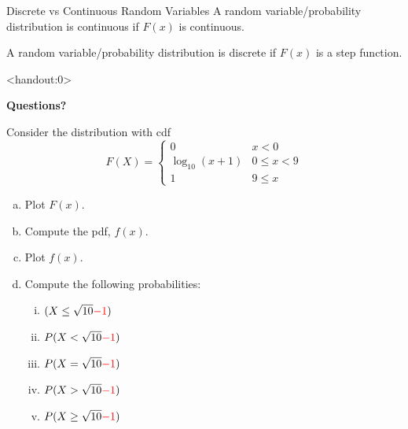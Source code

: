 \begin{frame}
  \begin{block}{Discrete vs Continuous Random Variables}
    A random variable/probability distribution is continuous if $F(x)$ is continuous.

    \bigskip

    A random variable/probability distribution is discrete if $F(x)$ is a step function.

  \end{block}

\end{frame}

\begin{frame}<handout:0>
  \begin{center}
    \Huge{\textbf{Questions?}}
  \end{center}
\end{frame}

\begin{frame}

  \begin{block}{\exercise}
  
  Consider the distribution with cdf
  $$
  F(X)=
  \left\{
  \begin{array}{ll}
  0 & x < 0\\
  \log_{10}(x + 1) & 0 \leq x < 9\\
  1 & 9 \leq x
  \end{array}
  \right.
  $$
  
  \begin{enumerate}[a)]
  \item Plot $F(x)$.
  \item Compute the pdf, $f(x)$.
  \item Plot $f(x)$.
  \item Compute the following probabilities:
  \begin{enumerate}[i.]
  \item $(X \leq \sqrt{10}\textcolor{red}{-1})$
  \item $P(X < \sqrt{10} \textcolor{red}{-1})$
  \item $P(X = \sqrt{10}\textcolor{red}{-1})$
  \item $P(X > \sqrt{10}\textcolor{red}{-1})$
  \item $P(X \geq \sqrt{10}\textcolor{red}{-1})$
  \end{enumerate}
  \end{enumerate}
  \end{block}
\end{frame}


